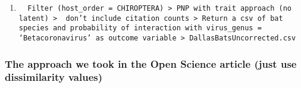 \documentclass[
]{article}
\newenvironment{Shaded}{\begin{snugshade}}{\end{snugshade}}
\newcommand{\DataTypeTok}[1]{\textcolor[rgb]{0.13,0.29,0.53}{#1}}
\newcommand{\DecValTok}[1]{\textcolor[rgb]{0.00,0.00,0.81}{#1}}
\newcommand{\KeywordTok}[1]{\textcolor[rgb]{0.13,0.29,0.53}{\textbf{#1}}}
\newcommand{\NormalTok}[1]{#1}
\newcommand{\OperatorTok}[1]{\textcolor[rgb]{0.81,0.36,0.00}{\textbf{#1}}}
\newcommand{\OtherTok}[1]{\textcolor[rgb]{0.56,0.35,0.01}{#1}}
\newcommand{\StringTok}[1]{\textcolor[rgb]{0.31,0.60,0.02}{#1}}
\begin{document}
\begin{enumerate}
\def\labelenumi{\arabic{enumi}.}
\setcounter{enumi}{3}
\item
\begin{verbatim}
  Filter (host_order = CHIROPTERA) > PNP with trait approach (no latent) >  don’t include citation counts > Return a csv of bat species and probability of interaction with virus_genus = ‘Betacoronavirus’ as outcome variable > DallasBatsUncorrected.csv
\end{verbatim}
\end{enumerate}

\begin{Shaded}
\end{Shaded}

\hypertarget{the-approach-we-took-in-the-open-science-article-just-use-dissimilarity-values}{%
\subsubsection{The approach we took in the Open Science article (just
use dissimilarity
values)}\label{the-approach-we-took-in-the-open-science-article-just-use-dissimilarity-values}}
\end{document}
